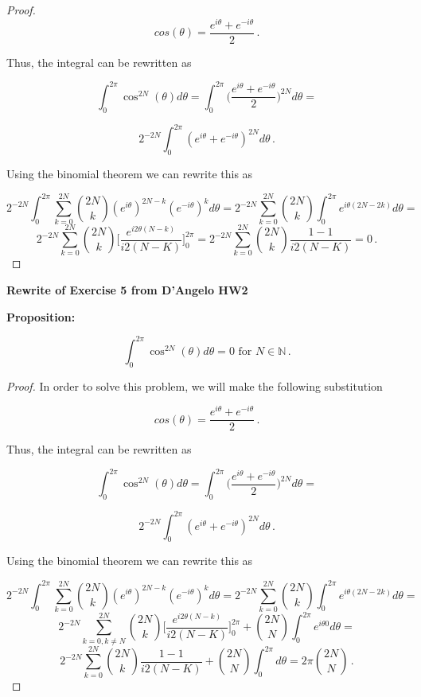 \documentclass[a4paper]{article}
\numberwithin{equation}{section}
\begin{document}
\begin{description}
\begin{proof}
$$cos(\theta) = \frac{e^{i\theta} + e^{-i\theta}}{2}\,.$$

Thus, the integral can be rewritten as

$$\int_0^{2\pi} \cos^{2N}(\theta)d\theta = \int_0^{2\pi} \Big(\frac{e^{i\theta} + e^{-i\theta}}{2}\Big)^{2N}d\theta = $$

$$2^{-2N} \int_0^{2\pi} (e^{i\theta} + e^{-i\theta})^{2N}d\theta\,.$$

Using the binomial theorem we can rewrite this as

$$2^{-2N} \int_0^{2\pi} \sum_{k=0}^{2N} {2N \choose k} (e^{i\theta})^{2N-k}(e^{-i\theta})^k d\theta = 2^{-2N} \sum_{k=0}^{2N}{2N \choose k} \int_0^{2\pi}  e^{i\theta(2N-2k)} d\theta = $$
$$2^{-2N} \sum_{k=0}^{2N}{2N \choose k} \Big[\frac{e^{i2\theta(N-k)}}{i2(N-K)}\Big]_0^{2\pi} = 2^{-2N} \sum_{k=0}^{2N}{2N \choose k} \frac{1-1}{i2(N-K)} = 0\,.$$

\end{proof}

\item \textbf{Rewrite of Exercise 5 from D'Angelo HW2}

\item{\bf{Proposition:}} 

$$\int_0^{2\pi} \cos^{2N}(\theta)d\theta = 0 \text{ for } N \in \mathbb{N}\,.$$

\begin{proof} In order to solve this problem, we will make the following substitution

$$cos(\theta) = \frac{e^{i\theta} + e^{-i\theta}}{2}\,.$$

Thus, the integral can be rewritten as

$$\int_0^{2\pi} \cos^{2N}(\theta)d\theta = \int_0^{2\pi} \Big(\frac{e^{i\theta} + e^{-i\theta}}{2}\Big)^{2N}d\theta = $$

$$2^{-2N} \int_0^{2\pi} (e^{i\theta} + e^{-i\theta})^{2N}d\theta\,.$$

Using the binomial theorem we can rewrite this as

$$2^{-2N} \int_0^{2\pi} \sum_{k=0}^{2N} {2N \choose k} (e^{i\theta})^{2N-k}(e^{-i\theta})^k d\theta = 2^{-2N} \sum_{k=0}^{2N}{2N \choose k} \int_0^{2\pi}  e^{i\theta(2N-2k)} d\theta = $$
$$2^{-2N} \sum_{k=0,k\neq N}^{2N}{2N \choose k} \Big[\frac{e^{i2\theta(N-k)}}{i2(N-K)}\Big]_0^{2\pi} + {2N \choose N} \int_0^{2\pi}  e^{i\theta0} d\theta = $$
$$2^{-2N} \sum_{k=0}^{2N}{2N \choose k} \frac{1-1}{i2(N-K)} + {2N \choose N} \int_0^{2\pi} d\theta = 2\pi{2N \choose N}\,.$$

\end{proof}

\end{description}
\end{document}
